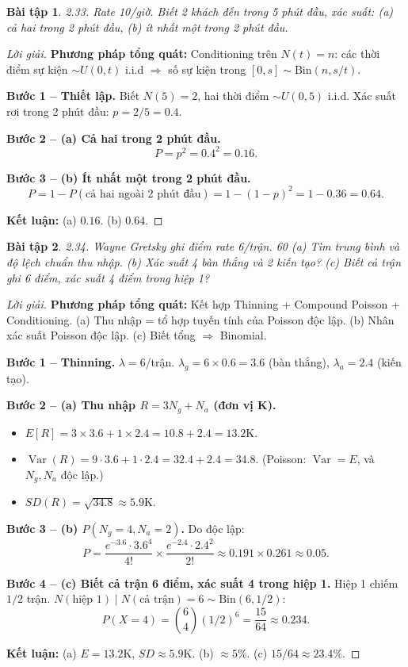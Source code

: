 \documentclass[8pt,a4paper]{article}
\newtheorem{exercise}{Bài tập}
\newenvironment{solution}{\begin{proof}[Lời giải]}{\end{proof}}
\newcommand{\Var}{\operatorname{Var}}
\begin{document}
\begin{exercise}
2.33. Rate 10/giờ. Biết 2 khách đến trong 5 phút đầu, xác suất: (a) cả hai trong 2 phút đầu, (b) ít nhất một trong 2 phút đầu.
\end{exercise}
\begin{solution}
\textbf{Phương pháp tổng quát:} Conditioning trên $N(t) = n$: các thời điểm sự kiện $\sim U(0,t)$ i.i.d $\Rightarrow$ số sự kiện trong $[0,s] \sim \text{Bin}(n, s/t)$.

\textbf{Bước 1 -- Thiết lập.} Biết $N(5) = 2$, hai thời điểm $\sim U(0,5)$ i.i.d. Xác suất rơi trong 2 phút đầu: $p = 2/5 = 0.4$.

\textbf{Bước 2 -- (a) Cả hai trong 2 phút đầu.}
\[
  P = p^2 = 0.4^2 = \boxed{0.16}.
\]

\textbf{Bước 3 -- (b) Ít nhất một trong 2 phút đầu.}
\[
  P = 1 - P(\text{cả hai ngoài 2 phút đầu}) = 1 - (1-p)^2 = 1 - 0.36 = \boxed{0.64}.
\]

\textbf{Kết luận:} (a) $0.16$. (b) $0.64$.
\end{solution}

\begin{exercise}
2.34. Wayne Gretsky ghi điểm rate 6/trận. 60%
(a) Tìm trung bình và độ lệch chuẩn thu nhập. (b) Xác suất 4 bàn thắng và 2 kiến tạo? (c) Biết cả trận ghi 6 điểm, xác suất 4 điểm trong hiệp 1?
\end{exercise}
\begin{solution}
\textbf{Phương pháp tổng quát:} Kết hợp Thinning + Compound Poisson + Conditioning. (a) Thu nhập = tổ hợp tuyến tính của Poisson độc lập. (b) Nhân xác suất Poisson độc lập. (c) Biết tổng $\Rightarrow$ Binomial.

\textbf{Bước 1 -- Thinning.} $\lambda = 6$/trận. $\lambda_g = 6 \times 0.6 = 3.6$ (bàn thắng), $\lambda_a = 2.4$ (kiến tạo).

\textbf{Bước 2 -- (a) Thu nhập $R = 3N_g + N_a$ (đơn vị K).}
\begin{itemize}[nosep]
  \item $E[R] = 3 \times 3.6 + 1 \times 2.4 = 10.8 + 2.4 = \boxed{13.2}$K.
  \item $\Var(R) = 9 \cdot 3.6 + 1 \cdot 2.4 = 32.4 + 2.4 = 34.8$. (Poisson: $\Var = E$, và $N_g, N_a$ độc lập.)
  \item $SD(R) = \sqrt{34.8} \approx \boxed{5.9}$K.
\end{itemize}

\textbf{Bước 3 -- (b) $P(N_g = 4, N_a = 2)$.} Do độc lập:
\[
  P = \frac{e^{-3.6} \cdot 3.6^4}{4!} \times \frac{e^{-2.4} \cdot 2.4^2}{2!} \approx 0.191 \times 0.261 \approx \boxed{0.05}.
\]

\textbf{Bước 4 -- (c) Biết cả trận 6 điểm, xác suất 4 trong hiệp 1.} Hiệp 1 chiếm $1/2$ trận. $N(\text{hiệp 1}) \mid N(\text{cả trận}) = 6 \sim \text{Bin}(6, 1/2)$:
\[
  P(X=4) = \binom{6}{4}(1/2)^6 = \frac{15}{64} \approx \boxed{0.234}.
\]

\textbf{Kết luận:} (a) $E = 13.2$K, $SD \approx 5.9$K. (b) $\approx 5\%$. (c) $15/64 \approx 23.4\%$.
\end{solution}
\end{document}
